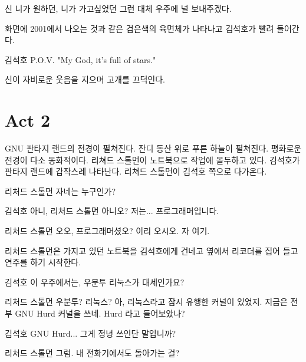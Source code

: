 \documentclass{screenplay}
\begin{document}
    \begin{dialogue}{신}
        니가 원하던, 니가 가고싶었던 그런 대체 우주에 널 보내주겠다.
    \end{dialogue}
    
    화면에 2001에서 나오는 것과 같은 검은색의 육면체가 나타나고 김석호가 빨려 들어간다.
    
    \begin{dialogue}{김석호}
        P.O.V. "My God, it's full of stars."
    \end{dialogue}
    
    신이 자비로운 웃음을 지으며 고개를 끄덕인다.
    
    \fadeout
    
    \section*{Act 2}
    
    \fadein
    
    
    GNU 판타지 랜드의 전경이 펼쳐진다. 잔디 동산 위로 푸른 하늘이 펼쳐진다. 평화로운 전경이 다소 동화적이다. 리쳐드 스톨먼이 노트북으로 작업에 몰두하고 있다. 김석호가 판타지 랜드에 갑작스레 나타난다. 리쳐드 스톨먼이 김석호 쪽으로 다가온다.
    
    \begin{dialogue}{리처드 스톨먼}
        자네는 누구인가?
    \end{dialogue}
    
    \begin{dialogue}{김석호}
        아니, 리처드 스톨먼 아니오? 저는... 프로그래머입니다.
    \end{dialogue}
    
    \begin{dialogue}{리처드 스톨먼}
        오오, 프로그래머셨오? 이리 오시오. 자 여기.
    \end{dialogue}
    
    리처드 스톨먼은 가지고 있던 노트북을 김석호에게 건네고 옆에서 리코더를 집어 들고 연주를 하기 시작한다.
    
    \begin{dialogue}[한참 이것 저것 살펴보다가]{김석호}
        이 우주에서는, 우분투 리눅스가 대세인가요?
    \end{dialogue}
    \begin{dialogue}{리처드 스톨먼}
        우분투? 리눅스?
        아, 리눅스라고 잠시 유행한 커널이 있었지. 지금은 전부 GNU Hurd 커널을 쓰네. Hurd 라고 들어보았나?
    \end{dialogue}
    \begin{dialogue}[감격해 하며]{김석호}
        GNU Hurd... 그게 정녕 쓰인단 말입니까?
    \end{dialogue}
    \begin{dialogue}{리처드 스톨먼}
        그럼. 내 전화기에서도 돌아가는 걸?
    \end{dialogue}
    
\end{document}
